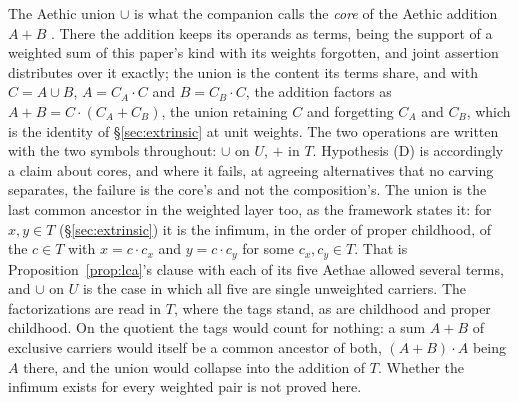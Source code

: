 \noindent The Aethic union $\cup$ is what the companion calls the \emph{core} of the Aethic addition $A + B$ \cite{Aethus}. There the addition keeps its operands as terms, being the support of a weighted sum of this paper's kind with its weights forgotten, and joint assertion distributes over it exactly; the union is the content its terms share, and with $C = A \cup B$, $A = C_A \cdot C$ and $B = C_B \cdot C$, the addition factors as $A + B = C \cdot (C_A + C_B)$, the union retaining $C$ and forgetting $C_A$ and $C_B$, which is the identity of \S\ref{sec:extrinsic} at unit weights. The two operations are written with the two symbols throughout: $\cup$ on $U$, $+$ in $T$. Hypothesis (D) is accordingly a claim about cores, and where it fails, at agreeing alternatives that no carving separates, the failure is the core's and not the composition's. The union is the last common ancestor in the weighted layer too, as the framework states it: for $x, y \in T$ (\S\ref{sec:extrinsic}) it is the infimum, in the order of proper childhood, of the $c \in T$ with $x = c \cdot c_x$ and $y = c \cdot c_y$ for some $c_x, c_y \in T$. That is Proposition~\ref{prop:lca}'s clause with each of its five Aethae allowed several terms, and $\cup$ on $U$ is the case in which all five are single unweighted carriers. The factorizations are read in $T$, where the tags stand, as are childhood and proper childhood. On the quotient the tags would count for nothing: a sum $A + B$ of exclusive carriers would itself be a common ancestor of both, $(A + B) \cdot A$ being $A$ there, and the union would collapse into the addition of $T$. Whether the infimum exists for every weighted pair is not proved here.
